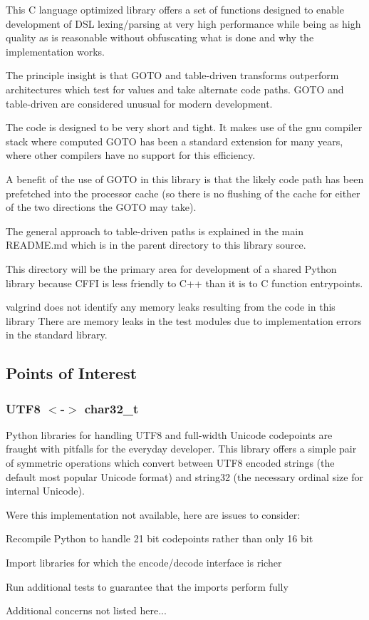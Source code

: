 This C language optimized library offers a set of functions designed to enable development of D\+S\+L lexing/parsing at very high performance while being as high quality as is reasonable without obfuscating what is done and why the implementation works.

The principle insight is that G\+O\+T\+O and table-\/driven transforms outperform architectures which test for values and take alternate code paths. G\+O\+T\+O and table-\/driven are considered unusual for modern development.

The code is designed to be very short and tight. It makes use of the gnu compiler stack where computed G\+O\+T\+O has been a standard extension for many years, where other compilers have no support for this efficiency.

A benefit of the use of G\+O\+T\+O in this library is that the likely code path has been prefetched into the processor cache (so there is no flushing of the cache for either of the two directions the G\+O\+T\+O may take).

The general approach to table-\/driven paths is explained in the main R\+E\+A\+D\+M\+E.\+md which is in the parent directory to this library source.

This directory will be the primary area for development of a shared Python library because C\+F\+F\+I is less friendly to C++ than it is to C function entrypoints.

valgrind does not identify any memory leaks resulting from the code in this library There are memory leaks in the test modules due to implementation errors in the standard library.

\subsection*{Points of Interest}

\subsubsection*{U\+T\+F8 $<$-\/$>$ char32\+\_\+t}

Python libraries for handling U\+T\+F8 and full-\/width Unicode codepoints are fraught with pitfalls for the everyday developer. This library offers a simple pair of symmetric operations which convert between U\+T\+F8 encoded strings (the default most popular Unicode format) and string32 (the necessary ordinal size for internal Unicode).

Were this implementation not available, here are issues to consider\+:
\begin{DoxyItemize}
\item Recompile Python to handle 21 bit codepoints rather than only 16 bit
\item Import libraries for which the encode/decode interface is richer
\item Run additional tests to guarantee that the imports perform fully
\item Additional concerns not listed here...
\end{DoxyItemize}



